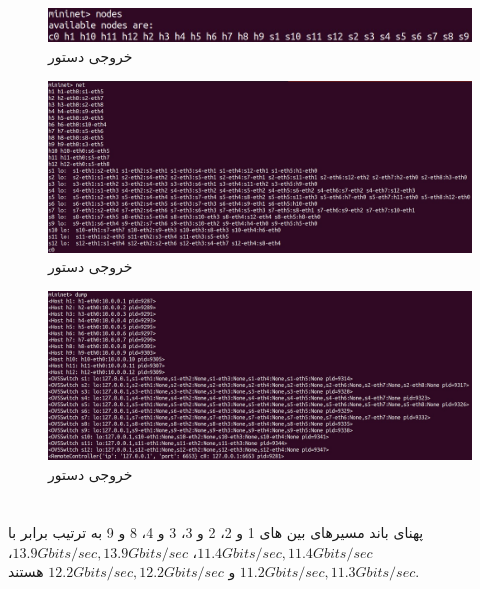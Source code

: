 \documentclass{article}
\begin{document}
\section{}
\begin{figure}[H]
    \centering
    \includegraphics[width=1.0\textwidth]{figures/4a.jpg}
    \caption
	{
خروجی دستور 
	}
    \label{fig:fig1}
\end{figure}
\begin{figure}[H]
    \centering
    \includegraphics[width=1.0\textwidth]{figures/4b.jpg}
    \caption
	{
خروجی دستور 
	}
    \label{fig:fig1}
\end{figure}
\begin{figure}[H]
    \centering
    \includegraphics[width=1.0\textwidth]{figures/4c.jpg}
    \caption
	{
خروجی دستور 
	}
    \label{fig:fig1}
\end{figure}


\section{}
پهنای باند مسیرهای بین های 1 و 2، 2 و 3، 3 و 4، 8 و 9 به ترتیب برابر با
$11.4 Gbits/sec, 11.4 Gbits/sec$،
$13.9 Gbits/sec, 13.9 Gbits/sec$،
$11.2 Gbits/sec, 11.3 Gbits/sec$ و
$12.2 Gbits/sec, 12.2 Gbits/sec$ 
هستند.
\end{document}
